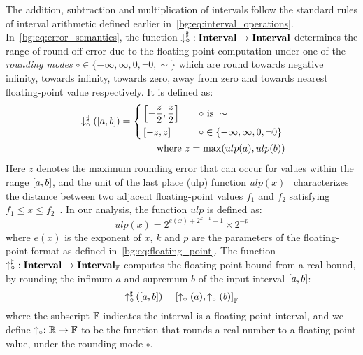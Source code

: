 The addition, subtraction and multiplication of intervals follow
the standard rules of interval arithmetic defined earlier
in~\eqref{bg:eq:interval_operations}.  In~\eqref{bg:eq:error_semantics}, the
function $\operatorname{\downarrow^\sharp_\circ}: \mathbf{Interval} \to \mathbf{Interval}$ determines the range
of round-off error due to the floating-point computation under one of the
\emph{rounding modes} $\circ \in \{ -\infty, \infty, 0, \neg0, \sim \}$ which
are round towards negative infinity, towards infinity, towards zero, away from
zero and towards nearest floating-point value respectively.  It is defined as:
\begin{equation}
    \begin{aligned}
        & \downarrow^\sharp_\circ(\left[{a}, {b}\right]) = \left\{
            \begin{aligned}
                & \left[ -\frac{z}{2}, \frac{z}{2}\right]
                    & \quad \circ & \text{~is~}\sim \\
                & \left[ -z, z\right]
                    & \quad \circ & \in \{ -\infty, \infty, 0, \neg0 \}
            \end{aligned}
        \right. \\
        & \qquad\qquad\qquad\qquad \text{where~} z = \max(ulp(a), ulp(b))
    \end{aligned}
\end{equation}
Here $z$ denotes the maximum rounding error that can occur for values
within the range $\left[{a}, {b}\right]$, and the unit of the last place (ulp)
function $ulp(x)$~\cite{muller} characterizes the distance between two
adjacent floating-point values $f_1$ and $f_2$ satisfying $f_1 \leq x \leq
f_2$~\cite{goldberg}. In our analysis, the function $ulp$ is defined as:
\begin{equation}
    ulp(x) = 2^{e(x) + 2^{k - 1} - 1} \times 2^{-p}
\end{equation}
where $e(x)$ is the exponent of $x$, $k$ and $p$ are the parameters of the
floating-point format as defined in~\eqref{bg:eq:floating_point}. The function
$\operatorname{\uparrow^\sharp_\circ}: \mathbf{Interval} \to \mathbf{Interval}_\mathbb{F}$ computes the floating-point
bound from a real bound, by rounding the infimum $a$ and supremum $b$ of the
input interval $\left[{a}, {b}\right]$:
\begin{equation}
    \operatorname{\uparrow^\sharp_\circ}\left(\left[a, b\right]\right)
    = {\left[
        \uparrow_\circ{\left(a\right)},
        \uparrow_\circ{\left(b\right)}
    \right]}_\mathbb{F}
\end{equation}
where the subscript $\mathbb{F}$ indicates the interval is a floating-point
interval, and we define $\uparrow_\circ: \mathbb{R} \to \mathbb{F}$ to be the
function that rounds a real number to a floating-point value, under the
rounding mode $\circ$.


